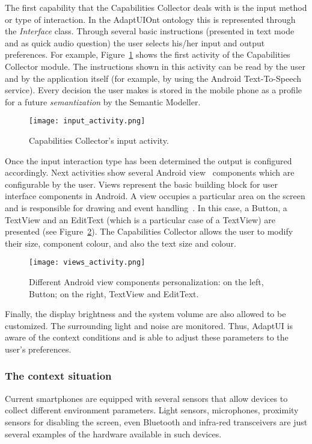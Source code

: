 The first capability that the Capabilities Collector deals with is the input
method or type of interaction. In the AdaptUIOnt ontology this is represented
through the \textit{Interface} class. Through several basic instructions
(presented in text mode and as quick audio question) the user selects his/her
input and output preferences. For example, Figure~\ref{fig:input_activity} shows
the first activity of the Capabilities Collector module. The instructions shown
in this activity can be read by the user and by the application itself (for
example, by using the Android Text-To-Speech~\citep{tts} service). Every decision
the user makes is stored in the mobile phone as a profile for a future
\textit{semantization} by the Semantic Modeller.

\begin{figure}
\centering
\texttt{[image: input\_activity.png]}
\caption{Capabilities Collector's input activity.}
\label{fig:input_activity}
\end{figure}

Once the input interaction type has been determined the output is configured 
accordingly. Next activities show several Android view~\citep{android_view} 
components which are configurable by the user. Views represent the basic 
building block for user interface components in Android. A view occupies a 
particular area on the screen and is responsible for drawing and event 
handling~\citep{android_view}. In this case, a Button, a TextView and an 
EditText (which is a particular case of a TextView) are presented (see 
Figure~\ref{fig:views_activity}). The Capabilities Collector allows the user to 
modify their size, component colour, and also the text size and colour.

\begin{figure}
\centering
\texttt{[image: views\_activity.png]}
\caption{Different Android view components
personalization: on the left, Button; on the right, TextView and EditText.}
\label{fig:views_activity}
\end{figure}

Finally, the display brightness and the system volume are also allowed to be
customized. The surrounding light and noise are monitored. Thus, AdaptUI is
aware of the context conditions and is able to adjust these parameters to 
the user's preferences.

 
\subsubsection{The context situation}
\label{sec:context_situation}
Current smartphones are equipped with several sensors that allow devices to
collect different environment parameters. Light sensors, microphones, proximity 
sensors for disabling the screen, even Bluetooth and infra-red transceivers are 
just several examples of the hardware available in such devices.


